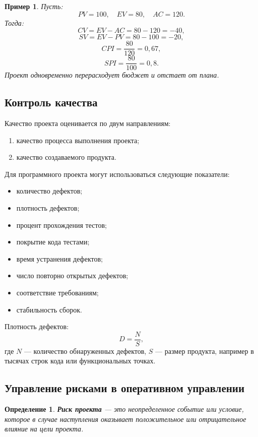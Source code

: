 \documentclass[12pt,a4paper]{article}
\newtheorem{definition}{Определение}
\newtheorem{example}{Пример}
\begin{document}
\begin{example}
Пусть:
\[
PV = 100,\quad EV = 80,\quad AC = 120.
\]
Тогда:
\[
CV = EV - AC = 80 - 120 = -40,
\]
\[
SV = EV - PV = 80 - 100 = -20,
\]
\[
CPI = \frac{80}{120} = 0{,}67,
\]
\[
SPI = \frac{80}{100} = 0{,}8.
\]
Проект одновременно перерасходует бюджет и отстает от плана.
\end{example}

\subsection{Контроль качества}

Качество проекта оценивается по двум направлениям:
\begin{enumerate}
    \item качество процесса выполнения проекта;
    \item качество создаваемого продукта.
\end{enumerate}

Для программного проекта могут использоваться следующие показатели:
\begin{itemize}
    \item количество дефектов;
    \item плотность дефектов;
    \item процент прохождения тестов;
    \item покрытие кода тестами;
    \item время устранения дефектов;
    \item число повторно открытых дефектов;
    \item соответствие требованиям;
    \item стабильность сборок.
\end{itemize}

Плотность дефектов:
\[
D = \frac{N}{S},
\]
где $N$ --- количество обнаруженных дефектов, $S$ --- размер продукта, например в тысячах строк кода или функциональных точках.

\subsection{Управление рисками в оперативном управлении}

\begin{definition}
\textbf{Риск проекта} --- это неопределенное событие или условие, которое в случае наступления оказывает положительное или отрицательное влияние на цели проекта.
\end{definition}
\end{document}
